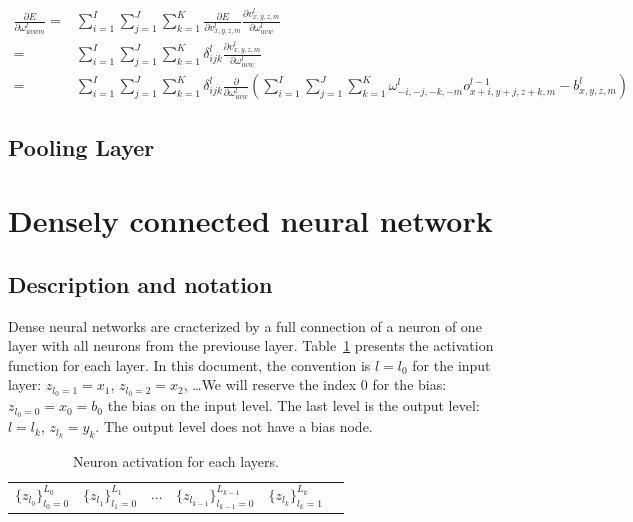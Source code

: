 \documentclass[final, paper=letter,5p,times,twocolumn]{elsarticle}
\begin{document}
\begin{equation*}
  \begin{split}
    \frac{\partial E}{\partial \omega_{uvwm}^{l}} =& \sum_{i=1}^{I}\sum_{j=1}^{J}\sum_{k=1}^{K} \frac{\partial E}{\partial v_{x,y,z,m}^{l}}\frac{\partial v_{x,y,z,m}^{l}}{\partial \omega_{uvw}^{l}}  \\
    =& \sum_{i=1}^{I}\sum_{j=1}^{J}\sum_{k=1}^{K} \delta_{ijk}^{l} \frac{\partial v_{x,y,z,m}^{l}}{\partial \omega_{uvw}^{l}}  \\
    =& \sum_{i=1}^{I}\sum_{j=1}^{J}\sum_{k=1}^{K} \delta_{ijk}^{l} \frac{\partial }{\partial \omega_{uvw}^{l}}  \left( \sum_{i=1}^{I}\sum_{j=1}^{J}\sum_{k=1}^{K}\omega_{-i,-j,-k,-m}^{l}o_{x+i,y+j,z+k,m}^{l-1} - b_{x,y,z,m}^{l} \right)
  \end{split}
  \label{eq:backward_weights} 
\end{equation*}


\subsection{Pooling Layer}



\section{Densely connected neural network}
\subsection{Description and notation}

Dense neural networks are cracterized by a full connection of a neuron of one layer with all neurons from the previouse layer. Table~\ref{Layers_activations} presents the activation function for each layer. In this document, the convention is $l = l_{0}$ for the input layer: $z_{l_{0} = 1} = x_{1}$, $z_{l_{0} = 2} = x_{2}$, \dots We will reserve the index 0 for the bias: $z_{l_{0} = 0} = x_{0} = b_{0}$ the bias on the input level. The last level is the output level: $l = l_{k}$, $z_{l_{k}} = y_{k}$. The output level does not have a bias node.

\begin{table}[]
\centering
\caption{Neuron activation for each layers.}
\label{Layers_activations}
\begin{tabular}{llllll}
 $\{ z_{l_{0}}\}_{l_{0} = 0}^{L_{0}}$&  $\{ z_{l_{1}}\}_{l_{1} = 0}^{L_{1}}$ &  $\cdots$ & $\{ z_{l_{k-1}}\}_{l_{k-1} = 0}^{L_{k-1}}$ &  $\{ z_{l_{k}}\}_{l_{k} = 1}^{L_{k}}$ &  \\ 
\end{tabular}
\end{table}
\end{document}
